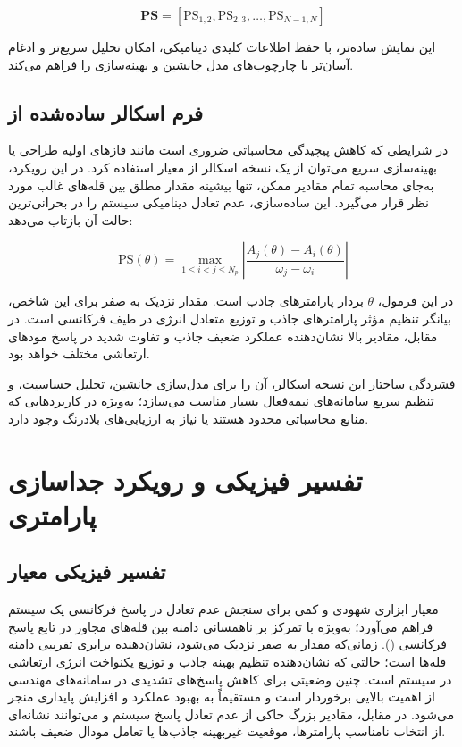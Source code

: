 \begin{equation}
\mathbf{PS} = \left[ \mathrm{PS}_{1,2}, \mathrm{PS}_{2,3}, \ldots, \mathrm{PS}_{N-1,N} \right]
\end{equation}

این نمایش ساده‌تر، با حفظ اطلاعات کلیدی دینامیکی، امکان تحلیل سریع‌تر و ادغام آسان‌تر با چارچوب‌های مدل جانشین و بهینه‌سازی را فراهم می‌کند.

\subsection{فرم اسکالر ساده‌شده از }

در شرایطی که کاهش پیچیدگی محاسباتی ضروری است مانند فازهای اولیه طراحی یا بهینه‌سازی سریع می‌توان از یک نسخه اسکالر از معیار  استفاده کرد. در این رویکرد، به‌جای محاسبه تمام مقادیر  ممکن، تنها بیشینه مقدار مطلق بین قله‌های غالب مورد نظر قرار می‌گیرد. این ساده‌سازی، عدم تعادل دینامیکی سیستم را در بحرانی‌ترین حالت آن بازتاب می‌دهد:

\begin{equation}
\mathrm{PS}(\theta) = \max_{1 \le i < j \le N_p} \left| \frac{A_j(\theta) - A_i(\theta)}{\omega_j - \omega_i} \right|
\end{equation}

در این فرمول، $\theta$ بردار پارامترهای جاذب است. مقدار نزدیک به صفر برای این شاخص، بیانگر تنظیم مؤثر پارامترهای جاذب و توزیع متعادل انرژی در طیف فرکانسی است. در مقابل، مقادیر بالا نشان‌دهنده عملکرد ضعیف جاذب و تفاوت شدید در پاسخ مودهای ارتعاشی مختلف خواهد بود.

فشردگی ساختار این نسخه اسکالر، آن را برای مدل‌سازی جانشین، تحلیل حساسیت، و تنظیم سریع سامانه‌های نیمه‌فعال بسیار مناسب می‌سازد؛ به‌ویژه در کاربردهایی که منابع محاسباتی محدود هستند یا نیاز به ارزیابی‌های بلادرنگ وجود دارد.


\section{تفسیر فیزیکی و رویکرد جداسازی پارامتری}

\subsection{تفسیر فیزیکی معیار }
معیار  ابزاری شهودی و کمی برای سنجش عدم تعادل در پاسخ فرکانسی یک سیستم فراهم می‌آورد؛ به‌ویژه با تمرکز بر ناهمسانی دامنه بین قله‌های مجاور در تابع پاسخ فرکانسی (). زمانی‌که مقدار  به صفر نزدیک می‌شود، نشان‌دهنده برابری تقریبی دامنه قله‌ها است؛ حالتی که نشان‌دهنده تنظیم بهینه جاذب و توزیع یکنواخت انرژی ارتعاشی در سیستم است. چنین وضعیتی برای کاهش پاسخ‌های تشدیدی در سامانه‌های مهندسی از اهمیت بالایی برخوردار است و مستقیماً به بهبود عملکرد و افزایش پایداری منجر می‌شود. در مقابل، مقادیر بزرگ  حاکی از عدم تعادل پاسخ سیستم و می‌توانند نشانه‌ای از انتخاب نامناسب پارامترها، موقعیت غیربهینه جاذب‌ها یا تعامل مودال ضعیف باشند.

